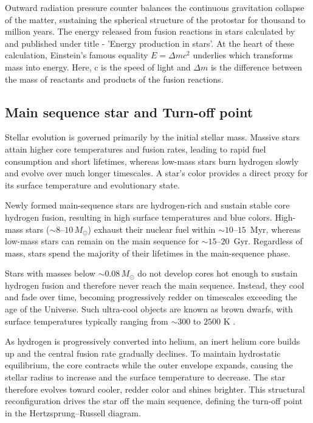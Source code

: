  

Outward radiation pressure counter balances the continuous gravitation collapse of the matter, sustaining the spherical structure of the protostar for thousand to million years. The energy released from fusion reactions in stars calculated by \cite{1939bethe} and published under title - 'Energy production in stars'. At the heart of these calculation, Einstein's famous equality $E = \Delta m c^2$ underlies which transforms mass into energy. Here, c is the speed of light and $\Delta m$ is the difference between the mass of reactants and products of the fusion reactions. 


\subsection{Main sequence star and Turn-off point}

Stellar evolution is governed primarily by the initial stellar mass. Massive stars attain higher core temperatures and fusion rates, leading to rapid fuel consumption and short lifetimes, whereas low-mass stars burn hydrogen slowly and evolve over much longer timescales. A star’s color provides a direct proxy for its surface temperature and evolutionary state.

Newly formed main-sequence stars are hydrogen-rich and sustain stable core hydrogen fusion, resulting in high surface temperatures and blue colors. High-mass stars ($\sim 8$--$10\,M_\odot$) exhaust their nuclear fuel within $\sim 10$--$15$~Myr, whereas low-mass stars can remain on the main sequence for $\sim 15$--$20$~Gyr. Regardless of mass, stars spend the majority of their lifetimes in the main-sequence phase. 

Stars with masses below $\sim 0.08\,M_\odot$ do not develop cores hot enough to sustain hydrogen fusion and therefore never reach the main sequence. Instead, they cool and fade over time, becoming progressively redder on timescales exceeding the age of the Universe. Such ultra-cool objects are known as brown dwarfs, with surface temperatures typically ranging from $\sim 300$ to $2500 $ K \citep{Kirkpatrick2005}.




As hydrogen is progressively converted into helium, an inert helium core builds up and the central fusion rate gradually declines. To maintain hydrostatic equilibrium, the core contracts while the outer envelope expands, causing the stellar radius to increase and the surface temperature to decrease. The star therefore evolves toward cooler, redder color and shines brighter. This structural reconfiguration drives the star off the main sequence, defining the turn-off point in the Hertzsprung--Russell diagram. 




